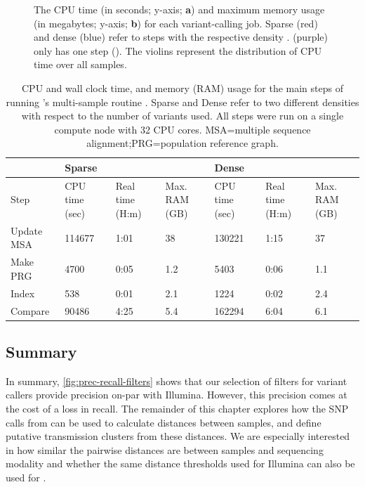 \begin{figure}
\begin{subfigure}[b]{0.475\textwidth}
         \caption{}
         \label{fig:max-mem}
     \end{subfigure}
        \caption{The CPU time (in seconds; y-axis; \textbf{a}) and maximum memory usage (in megabytes; y-axis; \textbf{b}) for each \ont{} variant-calling job. Sparse (red) and dense (blue) refer to \pandora{} steps with the respective density \prg{}.  (purple) only has one step (). The violins represent the distribution of CPU time over all samples.}
        \label{fig:var-comp-perf}
\end{figure}

\begin{table}
\centering
\begin{tabularx}{\textwidth}{|l|X|X|X|X|X|X|}
\hline
         & \multicolumn{3}{l|}{Sparse}                          & \multicolumn{3}{l|}{Dense}                           \\ \hline
Step     & CPU time (sec) & Real time (H:m) & Max. RAM (GB) & CPU time (sec) & Real time (H:m) & Max. RAM (GB) \\ \hline
Update MSA      & 114677         & 1:01             & 38              & 130221         & 1:15             & 37              \\ \hline
Make PRG & 4700           & 0:05             & 1.2              & 5403           & 0:06             & 1.1              \\ \hline
Index    & 538            & 0:01             & 2.1              & 1224            & 0:02             & 2.4              \\ \hline
Compare    & 90486            & 4:25             & 5.4              & 162294            & 6:04             & 6.1              \\ \hline
\end{tabularx}
\caption{CPU and wall clock time, and memory (RAM) usage for the main steps of running \pandora{}'s multi-sample routine . Sparse and Dense refer to two different densities with respect to the number of variants used. All steps were run on a single compute node with 32 CPU cores. MSA=multiple sequence alignment;PRG=population reference graph.}
\label{tab:compare-perf}
\end{table}

\subsection{Summary}
\label{sec:var-summary}

In summary, \autoref{fig:prec-recall-filters} shows that our selection of filters for \ont{} variant callers provide precision on-par with Illumina. However, this precision comes at the cost of a loss in recall. The remainder of this chapter explores how the SNP calls from \ont{} can be used to calculate distances between samples, and define putative transmission clusters from these distances. We are especially interested in how similar the pairwise distances are between samples and sequencing modality and whether the same distance thresholds used for Illumina can also be used for \ont{}.

